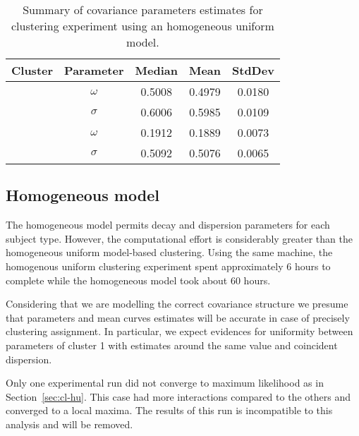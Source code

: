 \begin{table}[b]\centering
\caption{Summary of covariance parameters estimates for clustering experiment using an homogeneous uniform model.}
\begin{knitrout}
\color{fgcolor}
\begin{tabular}{ccccc}
\toprule
Cluster & Parameter & Median & Mean & StdDev\\
\midrule
 & $\omega$ & 0.5008 & 0.4979 & 0.0180\\

\multirow{-2}{*}{\centering\arraybackslash 1} & $\sigma$ & 0.6006 & 0.5985 & 0.0109\\
\cmidrule{1-5}
 & $\omega$ & 0.1912 & 0.1889 & 0.0073\\

\multirow{-2}{*}{\centering\arraybackslash 2} & $\sigma$ & 0.5092 & 0.5076 & 0.0065\\
\bottomrule
\end{tabular}


\end{knitrout}
\label{tab:cl-hu-tab}
\end{table}


\subsection{Homogeneous model}
\label{sec:cl-homog}

The homogeneous model permits decay and dispersion parameters for each subject type. However, the computational effort is considerably greater than the homogeneous uniform model-based clustering. Using the same machine, the homogenous uniform clustering experiment spent approximately 6 hours to complete while the homogeneous model took about 60 hours. 

Considering that we are modelling the correct covariance structure we presume that parameters and mean curves estimates will be accurate in case of precisely clustering assignment. In particular, we expect evidences for uniformity between parameters of cluster 1 with estimates around the same value and coincident dispersion.

Only one experimental run did not converge to maximum likelihood as in Section~\ref{sec:cl-hu}. This case had more interactions compared to the others and converged to a local maxima. The results of this run is incompatible to this analysis and will be removed.

